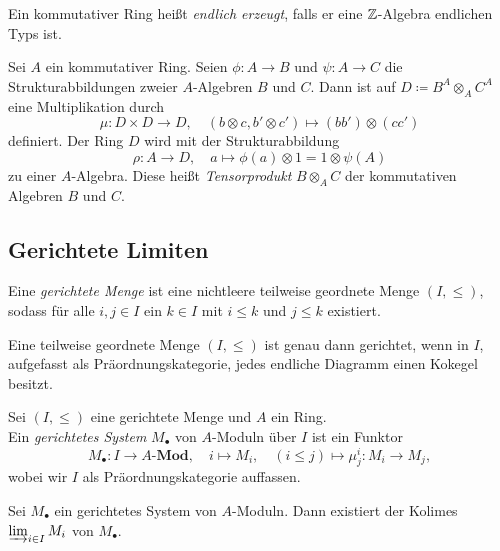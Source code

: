 \documentclass{cheat-sheet}
\newcommand{\Mod}{\mathbf{Mod}} %
\newcommand{\LMod}[1]{{#1}\text{-}\Mod} %
\begin{document}
\begin{defn}
  Ein kommutativer Ring heißt \emph{endlich erzeugt}, falls er eine $\mathbb{Z}$-Algebra endlichen Typs ist.
\end{defn}



\begin{defn}
  Sei $A$ ein kommutativer Ring.
  Seien $\phi : A \to B$ und $\psi : A \to C$ die Strukturabbildungen zweier $A$-Algebren $B$ und $C$.
  Dann ist auf $D \coloneqq B^A \otimes_A C^A$ eine Multiplikation durch
  \[
    \mu : D \times D \to D, \quad (b \otimes c, b' \otimes c') \mapsto (b b') \otimes (c c')
  \]
  definiert.
  Der Ring $D$ wird mit der Strukturabbildung
  \[
    \rho : A \to D, \quad a \mapsto \phi(a) \otimes 1 = 1 \otimes \psi(A)
  \]
  zu einer $A$-Algebra.
  Diese heißt \emph{Tensorprodukt} $B \otimes_A C$ der kommutativen Algebren $B$ und $C$.
\end{defn}

\subsection{Gerichtete Limiten}


\begin{defn}
  Eine \emph{gerichtete Menge} ist eine nichtleere teilweise geordnete Menge $(I, \leq)$, sodass für alle $i, j \in I$ ein $k \in I$ mit $i \leq k$ und $j \leq k$ existiert.
\end{defn}

\begin{bem}
  Eine teilweise geordnete Menge $(I, \leq)$ ist genau dann gerichtet, wenn in $I$, aufgefasst als Präordnungskategorie, jedes endliche Diagramm einen Kokegel besitzt.
\end{bem}

\begin{defn}
  Sei $(I, \leq)$ eine gerichtete Menge und $A$ ein Ring. \\
  Ein \emph{gerichtetes System} $M_\bullet$ von $A$-Moduln über $I$ ist ein Funktor
  \[
    M_\bullet : I \to \LMod{A}, \quad i \mapsto M_i, \quad (i \leq j) \mapsto \mu^i_j : M_i \to M_j,
  \]
  wobei wir $I$ als Präordnungskategorie auffassen.
\end{defn}

\begin{prop}
  Sei $M_\bullet$ ein gerichtetes System von $A$-Moduln.
  Dann existiert der Kolimes $\varinjlim_{i \in I} M_i$ von $M_\bullet$.
\end{prop}
\end{document}

